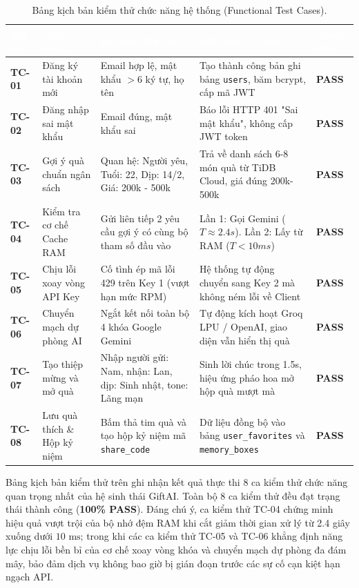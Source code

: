 \begin{table}[htbp]
\centering
\caption{Bảng kịch bản kiểm thử chức năng hệ thống (Functional Test Cases).}
\label{tab:test_cases}
\small
\renewcommand{\arraystretch}{1.25}
\begin{tabularx}{\textwidth}{|p{1.4cm}|p{2.8cm}|p{3.8cm}|X|p{1.4cm}|}
\hline
\rowcolor{PrimaryBlue}
\textcolor{white}{\textbf{Mã TC}} & 
\textcolor{white}{\textbf{Chức năng}} & 
\textcolor{white}{\textbf{Dữ liệu đầu vào}} & 
\textcolor{white}{\textbf{Kết quả kỳ vọng}} & 
\textcolor{white}{\textbf{Trạng thái}} \\
\hline
\textbf{TC-01} & Đăng ký tài khoản mới & Email hợp lệ, mật khẩu $>6$ ký tự, họ tên & Tạo thành công bản ghi bảng \texttt{users}, băm bcrypt, cấp mã JWT & \textbf{PASS} \\
\hline
\textbf{TC-02} & Đăng nhập sai mật khẩu & Email đúng, mật khẩu sai & Báo lỗi HTTP 401 "Sai mật khẩu", không cấp JWT token & \textbf{PASS} \\
\hline
\textbf{TC-03} & Gợi ý quà chuẩn ngân sách & Quan hệ: Người yêu, Tuổi: 22, Dịp: 14/2, Giá: 200k - 500k & Trả về danh sách 6-8 món quà từ TiDB Cloud, giá đúng 200k-500k & \textbf{PASS} \\
\hline
\textbf{TC-04} & Kiểm tra cơ chế Cache RAM & Gửi liên tiếp 2 yêu cầu gợi ý có cùng bộ tham số đầu vào & Lần 1: Gọi Gemini ($T \approx 2.4s$). Lần 2: Lấy từ RAM ($T < 10ms$) & \textbf{PASS} \\
\hline
\textbf{TC-05} & Chịu lỗi xoay vòng API Key & Cố tình ép mã lỗi 429 trên Key 1 (vượt hạn mức RPM) & Hệ thống tự động chuyển sang Key 2 mà không ném lỗi về Client & \textbf{PASS} \\
\hline
\textbf{TC-06} & Chuyển mạch dự phòng AI & Ngắt kết nối toàn bộ 4 khóa Google Gemini & Tự động kích hoạt Groq LPU / OpenAI, giao diện vẫn hiển thị quà & \textbf{PASS} \\
\hline
\textbf{TC-07} & Tạo thiệp mừng và mở quà & Nhập người gửi: Nam, nhận: Lan, dịp: Sinh nhật, tone: Lãng mạn & Sinh lời chúc trong 1.5s, hiệu ứng pháo hoa mở hộp quà mượt mà & \textbf{PASS} \\
\hline
\textbf{TC-08} & Lưu quà thích \& Hộp kỷ niệm & Bấm thả tim quà và tạo hộp kỷ niệm mã \texttt{share\_code} & Dữ liệu đồng bộ vào bảng \texttt{user\_favorites} và \texttt{memory\_boxes} & \textbf{PASS} \\
\hline
\end{tabularx}
\end{table}

Bảng kịch bản kiểm thử trên ghi nhận kết quả thực thi 8 ca kiểm thử chức năng quan trọng nhất của hệ sinh thái GiftAI. Toàn bộ 8 ca kiểm thử đều đạt trạng thái thành công (\textbf{100\% PASS}). Đáng chú ý, ca kiểm thử TC-04 chứng minh hiệu quả vượt trội của bộ nhớ đệm RAM khi cắt giảm thời gian xử lý từ 2.4 giây xuống dưới $10\text{ ms}$; trong khi các ca kiểm thử TC-05 và TC-06 khẳng định năng lực chịu lỗi bền bỉ của cơ chế xoay vòng khóa và chuyển mạch dự phòng đa đám mây, bảo đảm dịch vụ không bao giờ bị gián đoạn trước các sự cố cạn kiệt hạn ngạch API.

